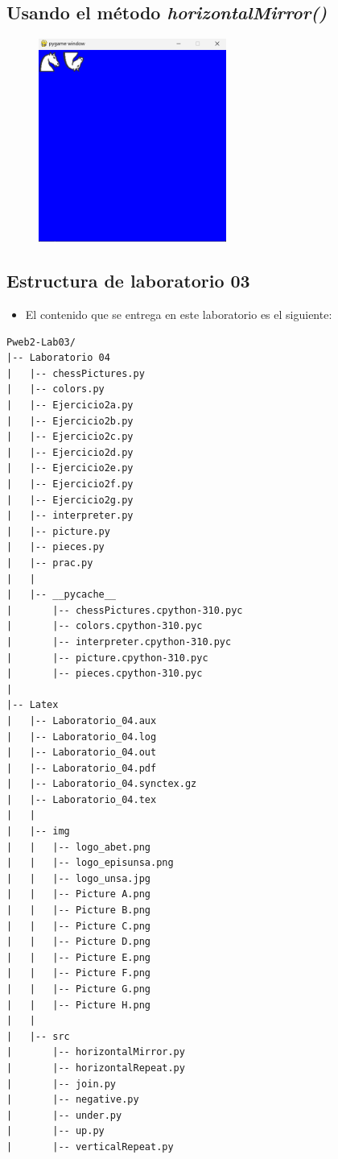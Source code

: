 \documentclass{article}
\begin{document}
	\subsection{Usando el método \textit{horizontalMirror()}}
	
	\begin{figure}[H]
		\centering
		\includegraphics[width=0.55\textwidth,keepaspectratio]{img/Picture H.png}
	\end{figure}		
	
		
	\subsection{Estructura de laboratorio 03}
	\begin{itemize}	
		\item El contenido que se entrega en este laboratorio es el siguiente:
	\end{itemize}
	
\begin{lstlisting}[style=ascii-tree]
Pweb2-Lab03/
|-- Laboratorio 04
|   |-- chessPictures.py
|   |-- colors.py
|   |-- Ejercicio2a.py
|   |-- Ejercicio2b.py
|   |-- Ejercicio2c.py
|   |-- Ejercicio2d.py
|   |-- Ejercicio2e.py
|   |-- Ejercicio2f.py
|   |-- Ejercicio2g.py
|   |-- interpreter.py
|   |-- picture.py
|   |-- pieces.py
|   |-- prac.py
|   |
|   |-- __pycache__
|       |-- chessPictures.cpython-310.pyc
|       |-- colors.cpython-310.pyc
|       |-- interpreter.cpython-310.pyc
|       |-- picture.cpython-310.pyc
|       |-- pieces.cpython-310.pyc
|
|-- Latex
|   |-- Laboratorio_04.aux
|   |-- Laboratorio_04.log
|   |-- Laboratorio_04.out
|   |-- Laboratorio_04.pdf
|   |-- Laboratorio_04.synctex.gz
|   |-- Laboratorio_04.tex
|   |
|   |-- img
|   |   |-- logo_abet.png
|   |   |-- logo_episunsa.png
|   |   |-- logo_unsa.jpg
|   |   |-- Picture A.png
|   |   |-- Picture B.png
|   |   |-- Picture C.png
|   |   |-- Picture D.png
|   |   |-- Picture E.png
|   |   |-- Picture F.png
|   |   |-- Picture G.png
|   |   |-- Picture H.png
|   |
|   |-- src
|       |-- horizontalMirror.py
|       |-- horizontalRepeat.py
|       |-- join.py
|       |-- negative.py
|       |-- under.py
|       |-- up.py
|       |-- verticalRepeat.py
\end{lstlisting}    
\end{document}
